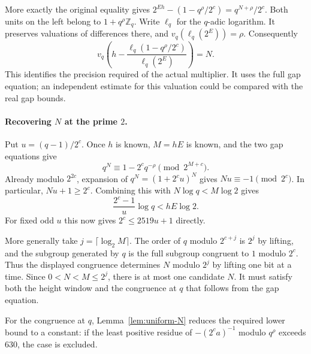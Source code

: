 \documentclass[11pt]{article}
\begin{document}
More exactly the original equality gives
$2^{Eh}-(1-q^\rho/2^c)=q^{N+\rho}/2^c$. Both units on the
left belong to $1+q^\rho\mathbb Z_q$. Write $\ell_q$ for the
$q$-adic logarithm. It preserves valuations of differences there,
and $v_q(\ell_q(2^E))=\rho$. Consequently
\[
 v_q\!\left(h-
 \frac{\ell_q(1-q^\rho/2^c)}{\ell_q(2^E)}\right)=N.
\]
This identifies the precision required of the actual multiplier.
It uses the full gap equation; an independent estimate for this
valuation could be compared with the real gap bounds.

\paragraph{Recovering $N$ at the prime $2$.}
Put $u=(q-1)/2^c$. Once $h$ is known, $M=hE$ is known, and the
two gap equations give
\[
q^N\equiv 1-2^c q^{-\rho}\pmod{2^{M+c}}.
\]
Already modulo $2^{2c}$, expansion of $q^N=(1+2^cu)^N$ gives
$Nu\equiv-1\pmod{2^c}$. In particular, $Nu+1\ge2^c$.
Combining this with $N\log q<M\log2$ gives
\[
\frac{2^c-1}{u}\log q<hE\log2.
\]
For fixed odd $u$ this now gives $2^c\le2519u+1$ directly.

More generally take $j=\lceil\log_2 M\rceil$. The order of $q$
modulo $2^{c+j}$ is $2^j$ by lifting, and the subgroup generated
by $q$ is the full subgroup congruent to $1$ modulo $2^c$.
Thus the displayed congruence determines $N$ modulo $2^j$ by
lifting one bit at a time. Since $0<N<M\le2^j$, there is at most
one candidate $N$. It must satisfy both the height window and
the congruence at $q$ that follows from the gap equation.

For the congruence at $q$, Lemma~\ref{lem:uniform-N} reduces the
required lower bound to a constant: if the least positive residue
of $-(2^ca)^{-1}$ modulo $q^\rho$ exceeds $630$, the case is excluded.
\end{document}
